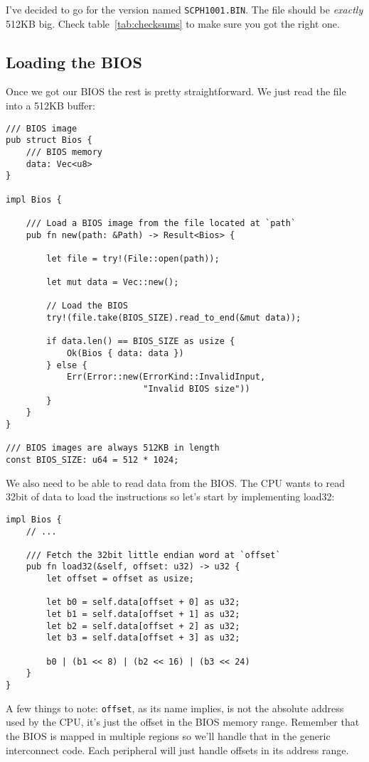 \documentclass[a4paper]{article}
\newcommand{\code}[1] {\texttt{#1}}
\begin{document}
I've decided to go for the version named \code{SCPH1001.BIN}. The file
should be \emph{exactly} 512KB big. Check table~\ref{tab:checksums} to make
sure you got the right one.

\subsection{Loading the BIOS}

Once we got our BIOS the rest is pretty straightforward. We just read
the file into a 512KB buffer:

\begin{lstlisting}
/// BIOS image
pub struct Bios {
    /// BIOS memory
    data: Vec<u8>
}

impl Bios {

    /// Load a BIOS image from the file located at `path`
    pub fn new(path: &Path) -> Result<Bios> {

        let file = try!(File::open(path));

        let mut data = Vec::new();

        // Load the BIOS
        try!(file.take(BIOS_SIZE).read_to_end(&mut data));

        if data.len() == BIOS_SIZE as usize {
            Ok(Bios { data: data })
        } else {
            Err(Error::new(ErrorKind::InvalidInput,
                           "Invalid BIOS size"))
        }
    }
}

/// BIOS images are always 512KB in length
const BIOS_SIZE: u64 = 512 * 1024;
\end{lstlisting}

We also need to be able to read data from the BIOS. The CPU wants to
read 32bit of data to load the instructions so let's start by
implementing load32:

\begin{lstlisting}
impl Bios {
    // ...

    /// Fetch the 32bit little endian word at `offset`
    pub fn load32(&self, offset: u32) -> u32 {
        let offset = offset as usize;

        let b0 = self.data[offset + 0] as u32;
        let b1 = self.data[offset + 1] as u32;
        let b2 = self.data[offset + 2] as u32;
        let b3 = self.data[offset + 3] as u32;

        b0 | (b1 << 8) | (b2 << 16) | (b3 << 24)
    }
}
\end{lstlisting}

A few things to note: \code{offset}, as its name implies, is not the
absolute address used by the CPU, it's just the offset in the BIOS
memory range. Remember that the BIOS is mapped in multiple regions so
we'll handle that in the generic interconnect code. Each peripheral
will just handle offsets in its address range.
\end{document}
